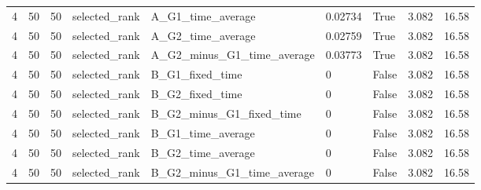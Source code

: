 \begin{longtable}{lllllllll}
4 & 50 & 50 & selected\_rank & A\_G1\_time\_average & 0.02734 & True & 3.082 & 16.58 \\
4 & 50 & 50 & selected\_rank & A\_G2\_time\_average & 0.02759 & True & 3.082 & 16.58 \\
4 & 50 & 50 & selected\_rank & A\_G2\_minus\_G1\_time\_average & 0.03773 & True & 3.082 & 16.58 \\
4 & 50 & 50 & selected\_rank & B\_G1\_fixed\_time & 0 & False & 3.082 & 16.58 \\
4 & 50 & 50 & selected\_rank & B\_G2\_fixed\_time & 0 & False & 3.082 & 16.58 \\
4 & 50 & 50 & selected\_rank & B\_G2\_minus\_G1\_fixed\_time & 0 & False & 3.082 & 16.58 \\
4 & 50 & 50 & selected\_rank & B\_G1\_time\_average & 0 & False & 3.082 & 16.58 \\
4 & 50 & 50 & selected\_rank & B\_G2\_time\_average & 0 & False & 3.082 & 16.58 \\
4 & 50 & 50 & selected\_rank & B\_G2\_minus\_G1\_time\_average & 0 & False & 3.082 & 16.58 \\
\bottomrule
\end{longtable}
\endgroup
